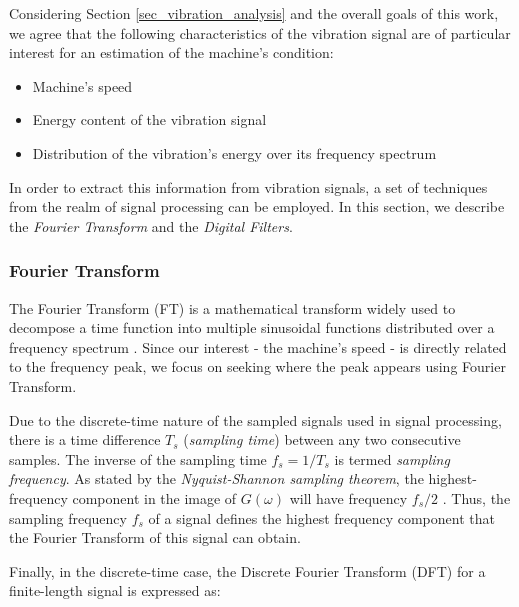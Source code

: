 \documentclass[conference]{IEEEtran}
\begin{document}
Considering Section \ref{sec_vibration_analysis} and the overall goals of this work, we agree that the following characteristics of the vibration signal are of particular interest for an estimation of the machine's condition:

\begin{itemize}
	\item Machine's speed
	\item Energy content of the vibration signal
	\item Distribution of the vibration's energy over its frequency spectrum
\end{itemize}


In order to extract this information from vibration signals, a set of techniques from the realm of signal processing can be employed. In this section, we describe the \textit{Fourier Transform} and the \textit{Digital Filters}.

\subsubsection{Fourier Transform}


The Fourier Transform (FT) is a mathematical transform widely used to decompose a time function into multiple sinusoidal functions distributed over a frequency spectrum \cite{b4}. Since our interest - the machine's speed - is directly related to the frequency peak, we focus on seeking where the peak appears using Fourier Transform.

Due to the discrete-time nature of the sampled signals used in signal processing, there is a time difference $T_{s}$ (\textit{sampling time}) between any two consecutive samples. The inverse of the sampling time $f_{s}=1/T_{s}$ is termed \textit{sampling frequency}. As stated by the \textit{Nyquist-Shannon sampling theorem}, the highest-frequency component in the image of $G(\omega)$ will have frequency $f_{s}/2$ \cite{b5}. Thus, the sampling frequency $f_{s}$ of a signal defines the highest frequency component that the Fourier Transform of this signal can obtain.

Finally, in the discrete-time case, the Discrete Fourier Transform (DFT) for a finite-length signal is expressed as: 
\end{document}
